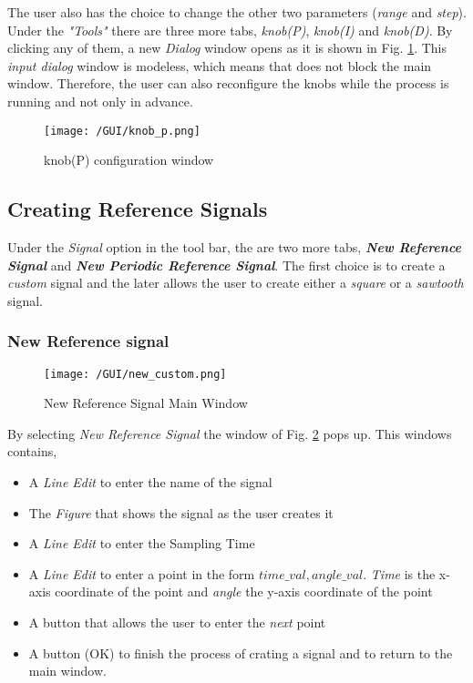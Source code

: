 The user also has the choice to change the other two parameters (\textit{range} and \textit{step}). Under the \textit{"Tools"} there are three more tabs, \textit{knob(P)}, \textit{knob(I)} and \textit{knob(D)}. By clicking any of them, a new \textit{Dialog} window opens as it is shown in Fig. \ref{fig:knob_p}. This \textit{input dialog} window is modeless, which means that does not block the main window. Therefore, the user can also reconfigure the knobs while the process is running and not only in advance.


\begin{figure}[t!]
\centering
	\texttt{[image: /GUI/knob\_p.png]}
	\caption{knob(P) configuration window}
	\label{fig:knob_p}
\end{figure}


\subsection{Creating Reference Signals}

Under the \textit{Signal} option in the tool bar, the are two more tabs, \textit{\textbf{New Reference Signal}} and \textit{\textbf{New Periodic Reference Signal}}. The first choice is to create a \textit{custom} signal and the later allows the user to create either a \textit{square} or a \textit{sawtooth} signal.

\subsubsection{New Reference signal} \label{sec:custom_signal}


\begin{figure}[h!]
\centering
	\texttt{[image: /GUI/new\_custom.png]}
	\caption{New Reference Signal Main Window}
	\label{fig:new_custom}
\end{figure}

By selecting \textit{New Reference Signal} the window of Fig. \ref{fig:new_custom} pops up. This windows contains,

\begin{itemize}
	\item A \textit{Line Edit} to enter the name of the signal
	\item The \textit{Figure} that shows the signal as the user creates it
	\item A \textit{Line Edit} to enter the Sampling Time
	\item A \textit{Line Edit} to enter a point in the form $time\_val, angle\_val$. \textit{Time} is the x-axis coordinate of the point and \textit{angle} the y-axis coordinate of the point
	\item A button that allows the user to enter the \textit{next} point
	\item A button (OK) to finish the process of crating a signal and to return to the main window.
\end{itemize}

